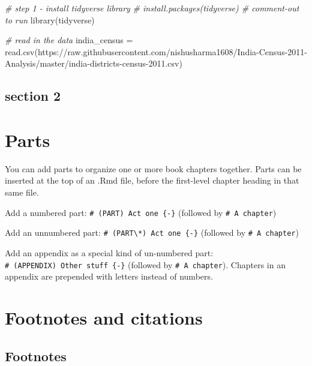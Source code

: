 \documentclass[
]{book}
\newenvironment{Shaded}{\begin{snugshade}}{\end{snugshade}}
\newcommand{\CommentTok}[1]{\textcolor[rgb]{0.56,0.35,0.01}{\textit{#1}}}
\newcommand{\FunctionTok}[1]{\textcolor[rgb]{0.00,0.00,0.00}{#1}}
\newcommand{\NormalTok}[1]{#1}
\newcommand{\OtherTok}[1]{\textcolor[rgb]{0.56,0.35,0.01}{#1}}
\newcommand{\StringTok}[1]{\textcolor[rgb]{0.31,0.60,0.02}{#1}}
\theoremstyle{definition}
\theoremstyle{definition}
\theoremstyle{definition}
\theoremstyle{definition}
\theoremstyle{remark}
\begin{document}
\begin{Shaded}
\begin{Highlighting}[]
\CommentTok{\# step 1 {-} install tidyverse library}
\CommentTok{\# install.packages(\textquotesingle{}tidyverse\textquotesingle{})  \# comment{-}out to run }
\FunctionTok{library}\NormalTok{(tidyverse)}

\CommentTok{\# read in the data}
\NormalTok{india\_census }\OtherTok{=} \FunctionTok{read.csv}\NormalTok{(}\StringTok{\textquotesingle{}https://raw.githubusercontent.com/nishusharma1608/India{-}Census{-}2011{-}Analysis/master/india{-}districts{-}census{-}2011.csv\textquotesingle{}}\NormalTok{)}
\end{Highlighting}
\end{Shaded}

\hypertarget{section-2}{%
\section{section 2}\label{section-2}}

\hypertarget{parts}{%
\chapter{Parts}\label{parts}}

You can add parts to organize one or more book chapters together. Parts can be inserted at the top of an .Rmd file, before the first-level chapter heading in that same file.

Add a numbered part: \texttt{\#\ (PART)\ Act\ one\ \{-\}} (followed by \texttt{\#\ A\ chapter})

Add an unnumbered part: \texttt{\#\ (PART\textbackslash{}*)\ Act\ one\ \{-\}} (followed by \texttt{\#\ A\ chapter})

Add an appendix as a special kind of un-numbered part: \texttt{\#\ (APPENDIX)\ Other\ stuff\ \{-\}} (followed by \texttt{\#\ A\ chapter}). Chapters in an appendix are prepended with letters instead of numbers.

\hypertarget{footnotes-and-citations}{%
\chapter{Footnotes and citations}\label{footnotes-and-citations}}

\hypertarget{footnotes}{%
\section{Footnotes}\label{footnotes}}
\end{document}
